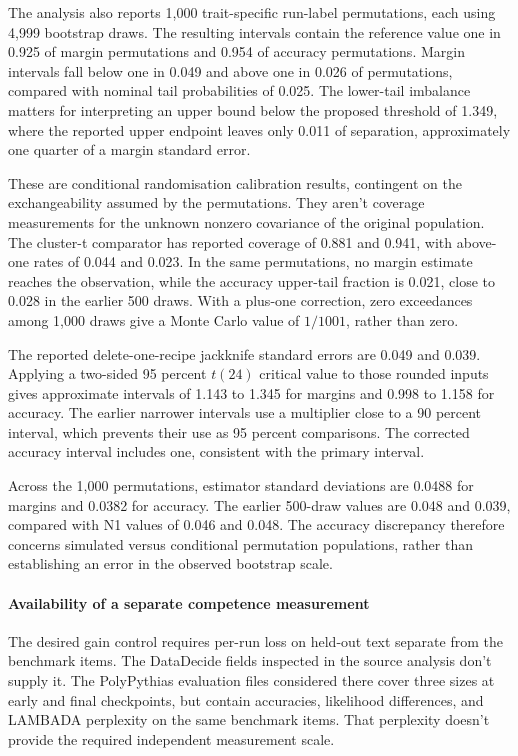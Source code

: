 The analysis also reports 1,000 trait-specific run-label permutations, each using 4,999 bootstrap draws. The resulting intervals contain the reference value one in 0.925 of margin permutations and 0.954 of accuracy permutations. Margin intervals fall below one in 0.049 and above one in 0.026 of permutations, compared with nominal tail probabilities of 0.025. The lower-tail imbalance matters for interpreting an upper bound below the proposed threshold of 1.349, where the reported upper endpoint leaves only 0.011 of separation, approximately one quarter of a margin standard error.

These are conditional randomisation calibration results, contingent on the exchangeability assumed by the permutations. They aren't coverage measurements for the unknown nonzero covariance of the original population. The cluster-t comparator has reported coverage of 0.881 and 0.941, with above-one rates of 0.044 and 0.023. In the same permutations, no margin estimate reaches the observation, while the accuracy upper-tail fraction is 0.021, close to 0.028 in the earlier 500 draws. With a plus-one correction, zero exceedances among 1,000 draws give a Monte Carlo value of $1/1001$, rather than zero.

The reported delete-one-recipe jackknife standard errors are 0.049 and 0.039. Applying a two-sided 95 percent $t(24)$ critical value to those rounded inputs gives approximate intervals of 1.143 to 1.345 for margins and 0.998 to 1.158 for accuracy. The earlier narrower intervals use a multiplier close to a 90 percent interval, which prevents their use as 95 percent comparisons. The corrected accuracy interval includes one, consistent with the primary interval.

Across the 1,000 permutations, estimator standard deviations are 0.0488 for margins and 0.0382 for accuracy. The earlier 500-draw values are 0.048 and 0.039, compared with N1 values of 0.046 and 0.048. The accuracy discrepancy therefore concerns simulated versus conditional permutation populations, rather than establishing an error in the observed bootstrap scale.

\paragraph{Availability of a separate competence measurement}
The desired gain control requires per-run loss on held-out text separate from the benchmark items. The DataDecide fields inspected in the source analysis don't supply it. The PolyPythias evaluation files considered there cover three sizes at early and final checkpoints, but contain accuracies, likelihood differences, and LAMBADA perplexity on the same benchmark items. That perplexity doesn't provide the required independent measurement scale.

